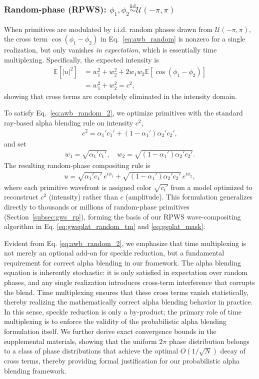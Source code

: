 \subsubsection{Random-phase (RPWS): $\phi_1, \phi_2 \overset{\text{iid}}\sim \mathcal{U}(-\pi, \pi)$}
When primitives are modulated by i.i.d. random phases drawn from $\mathcal{U}(-\pi,\pi)$, the cross term $\cos(\phi_1-\phi_2)$ in Eq.~\ref{eq:awb_random} is nonzero for a single realization, but only vanishes \textit{in expectation}, which is essentially time multiplexing. Specifically, the expected intensity is
\begin{align}
    \mathbb{E}[|u|^2] &= w_1^2 + w_2^2 + 2w_1w_2\mathbb{E}[\cos(\phi_1-\phi_2)] \label{eq:cross_term} \\ 
    &= w_1^2 + w_2^2 = c^2,
    \label{eq:awb_random_2}
\end{align}
showing that cross terms are completely eliminated in the intensity domain.

To satisfy Eq.~\ref{eq:awb_random_2}, we optimize primitives with the standard ray-based alpha blending rule on intensity $c^2$,
\begin{align}
    c^2 = \alpha_1'c_1' + (1-\alpha_1')\alpha_2'c_2',
\end{align}
and set
\begin{align}
    w_1 = \sqrt{\alpha_1'c_1'}, \quad 
    w_2 = \sqrt{(1-\alpha_1')\alpha_2'c_2'}.
\end{align}
The resulting random-phase compositing rule is
\begin{align}
    u = \sqrt{\alpha_1'c_1'} \, e^{i\phi_1} + 
        \sqrt{(1-\alpha_1')\alpha_2'c_2'} \, e^{i\phi_2},
    \label{eq:awb_random_final}
\end{align}
where each primitive wavefront is assigned color $\sqrt{c_i'}$ from a model optimized to reconstruct $c^2$ (intensity) rather than $c$ (amplitude). This formulation generalizes directly to thousands or millions of random-phase primitives (Section~\ref{subsec:gws_rp}), forming the basis of our RPWS wave-compositing algorithm in Eq. \ref{eq:gwsplat_random_tm} and \ref{eq:gsplat_mask}. 

Evident from Eq. \ref{eq:awb_random_2}, we emphasize that time multiplexing is not merely an optional add-on for speckle reduction, but a fundamental requirement for correct alpha blending in our framework. The alpha blending equation is inherently stochastic: it is only satisfied in expectation over random phases, and any single realization introduces cross-term interference that corrupts the blend. Time multiplexing ensures that these cross terms vanish statistically, thereby realizing the mathematically correct alpha blending behavior in practice. In this sense, speckle reduction is only a by-product; the primary role of time multiplexing is to enforce the validity of the probabilistic alpha blending formulation itself. We further derive exact convergence bounds in the supplemental materials, showing that the uniform $2\pi$ phase distribution belongs to a class of phase distributions that achieve the optimal $O(1/\sqrt{N})$ decay of cross terms, thereby providing formal justification for our probabilistic alpha blending framework.


